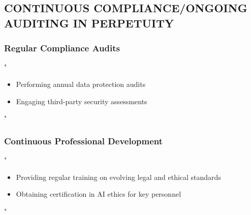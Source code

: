 \documentclass[14pt,a4paper]{article}
\begin{document}
\textit{\parencite{EC2024}}

\subsection*{CONTINUOUS COMPLIANCE/ONGOING AUDITING IN PERPETUITY}

\subsubsection*{Regular Compliance Audits}
"
\begin{itemize}
    \item Performing annual data protection audits
    \item Engaging third-party security assessments
\end{itemize}
"

\textit{\parencite{ICO2024}}

\subsubsection*{Continuous Professional Development}
"
\begin{itemize}
    \item Providing regular training on evolving legal and ethical standards
    \item Obtaining certification in AI ethics for key personnel
\end{itemize}
"

\textit{\parencite{CIPD2024}}


\newpage

\printbibliography
\end{document}
